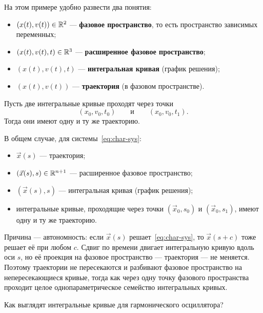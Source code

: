 На этом примере удобно развести два понятия:

\begin{itemize}[leftmargin=1.6em]
  \item $(x(t), v(t)) \in \mathbb{R}^2$ — \textbf{фазовое пространство}, то есть
        пространство зависимых переменных;
  \item $(x(t), v(t), t) \in \mathbb{R}^3$ — \textbf{расширенное фазовое пространство};
  \item $(x(t), v(t), t)$ — \textbf{интегральная кривая} (график решения);
  \item $(x(t), v(t))$ — \textbf{траектория} (в фазовом пространстве).
\end{itemize}

\begin{proposition}
Пусть две интегральные кривые проходят через точки
\[
  (x_0, v_0, t_0) \qquad\text{и}\qquad (x_0, v_0, t_1) .
\]
Тогда они имеют одну и ту же траекторию.
\end{proposition}

В общем случае, для системы~\eqref{eq:char-sys}:

\begin{itemize}[leftmargin=1.6em]
  \item $\vec x(s)$ — траектория;
  \item $(\vec x(s), s) \in \mathbb{R}^{n+1}$ — расширенное фазовое пространство;
  \item $(\vec x(s), s)$ — интегральная кривая (график решения);
  \item интегральные кривые, проходящие через точки $(\vec x_0, s_0)$ и
        $(\vec x_0, s_1)$, имеют одну и ту же траекторию.
\end{itemize}

\begin{idea}
Причина — автономность: если $\vec x(s)$ решает~\eqref{eq:char-sys}, то
$\vec x(s + c)$ тоже решает её при любом $c$. Сдвиг по времени двигает
интегральную кривую вдоль оси $s$, но её проекция на фазовое пространство —
траектория — не меняется. Поэтому траектории не пересекаются и разбивают
фазовое пространство на непересекающиеся кривые, тогда как через одну точку
фазового пространства проходит целое однопараметрическое семейство
интегральных кривых.
\end{idea}

\begin{exercise}
Как выглядят интегральные кривые для гармонического осциллятора?
\end{exercise}

